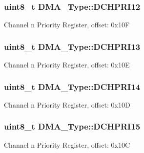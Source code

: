 \subsubsection[{\texorpdfstring{D\+C\+H\+P\+R\+I12}{DCHPRI12}}]{ uint8\+\_\+t D\+M\+A\+\_\+\+Type\+::\+D\+C\+H\+P\+R\+I12}\hypertarget{structDMA__Type_a4e5fd529902d6f6fc845c79cc63cfd9b}{}\label{structDMA__Type_a4e5fd529902d6f6fc845c79cc63cfd9b}
Channel n Priority Register, offset\+: 0x10F 
\subsubsection[{\texorpdfstring{D\+C\+H\+P\+R\+I13}{DCHPRI13}}]{ uint8\+\_\+t D\+M\+A\+\_\+\+Type\+::\+D\+C\+H\+P\+R\+I13}\hypertarget{structDMA__Type_ac63d4cefc0d8fbf64086796fd817ff55}{}\label{structDMA__Type_ac63d4cefc0d8fbf64086796fd817ff55}
Channel n Priority Register, offset\+: 0x10E 
\subsubsection[{\texorpdfstring{D\+C\+H\+P\+R\+I14}{DCHPRI14}}]{ uint8\+\_\+t D\+M\+A\+\_\+\+Type\+::\+D\+C\+H\+P\+R\+I14}\hypertarget{structDMA__Type_a660bf74d1bc09d545df004079454f8d3}{}\label{structDMA__Type_a660bf74d1bc09d545df004079454f8d3}
Channel n Priority Register, offset\+: 0x10D 
\subsubsection[{\texorpdfstring{D\+C\+H\+P\+R\+I15}{DCHPRI15}}]{ uint8\+\_\+t D\+M\+A\+\_\+\+Type\+::\+D\+C\+H\+P\+R\+I15}\hypertarget{structDMA__Type_ab22cb53ea11ed72fb7d13e6360ea7796}{}\label{structDMA__Type_ab22cb53ea11ed72fb7d13e6360ea7796}
Channel n Priority Register, offset\+: 0x10C 

